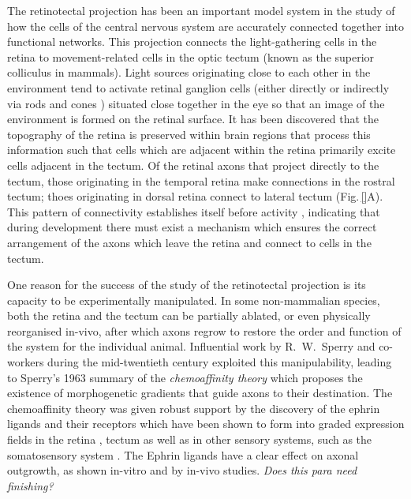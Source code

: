 \documentclass[11pt, a4paper]{article}
\begin{document}
The retinotectal projection has been an important model system in the study of
how the cells of the central nervous system are accurately connected together
into functional networks. This projection connects the light-gathering cells
in the retina to movement-related cells in the optic tectum (known as the
superior colliculus in mammals). Light sources originating close to each other
in the environment tend to activate retinal ganglion cells (either
directly \cite{iRGC_citation} or indirectly via rods and
cones \cite{rods_cones_citations}) situated close together in the eye so that
an image of the environment is formed on the retinal surface. It has been
discovered that the topography of the retina is preserved within brain regions
that process this information such that cells which are adjacent within the
retina primarily excite cells adjacent in the tectum. Of the retinal axons
that project directly to the tectum, those originating in the temporal retina
make connections in the rostral tectum; thoes originating in dorsal retina
connect to lateral tectum (Fig.\,\ref{}A).  This pattern of connectivity
establishes itself before activity \citep{something}, indicating that during
development there must exist a mechanism which ensures the correct arrangement
of the axons which leave the retina and connect to cells in the tectum.

One reason for the success of the study of the retinotectal projection is its
capacity to be experimentally manipulated. In some non-mammalian species, both
the retina and the tectum can be partially ablated, or even physically
reorganised in-vivo, after which axons regrow to restore the order and
function of the system for the individual animal. Influential work by
R.~W.~Sperry and co-workers during the mid-twentieth century exploited this
manipulability, leading to Sperry's 1963 summary of the \emph{chemoaffinity
theory} \citep{sperry_chemoaffinity_1963} which proposes the existence of
morphogenetic gradients that guide axons to their destination. The
chemoaffinity theory was given robust support by the discovery of the ephrin
ligands and their
receptors \citep{cheng_complementary_1995,drescher_vitro_1995} which have been
shown to form into graded expression fields in the
retina \citep{braisted_graded_1997},
tectum \citep{braisted_graded_1997,feldheim_genetic_2000} as well as in other
sensory systems, such as the somatosensory
system \citep{vanderhaeghen_mapping_2000}. The Ephrin ligands have a clear
effect on axonal outgrowth, as shown
in-vitro \citep{cheng_complementary_1995,drescher_vitro_1995,hansen_retinal_2004}
and by
in-vivo \citep{frisen_ephrin-a5_1998,rodger_transient_2000,mann_topographic_2002,hindges_ephb_2002}
studies. \emph{Does this para need finishing?}
%
%
%
%
%
%
%
%
\end{document}
